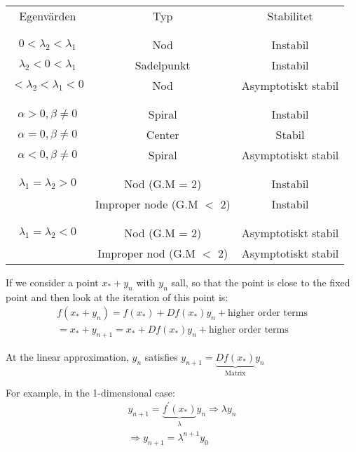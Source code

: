 \begin{center}
  \begin{tabular}{c|c|c}
    Egenvärden&Typ&Stabilitet\\\\
    \hline\\
    $0<\lambda_2<\lambda_1$&Nod&Instabil\\
    $\lambda_2<0<\lambda_1$&Sadelpunkt&Instabil\\
    $<\lambda_2<\lambda_1<0$&Nod&Asymptotiskt stabil\\\\
    \hline\\
    $\alpha>0, \beta\neq0$&Spiral&Instabil\\
    $\alpha=0, \beta\neq0$&Center&Stabil\\
    $\alpha<0, \beta\neq0$&Spiral&Asymptotiskt stabil\\\\
    \hline\\
    $\lambda_1=\lambda_2 > 0$&Nod (G.M = 2)&Instabil\\
    &Improper node (G.M $<$ 2)&Instabil\\\\
    \hline\\
    $\lambda_1=\lambda_2<0$&Nod (G.M = 2)&Asymptotiskt stabil\\
    &Improper nod (G.M $<$ 2)&Asymptotiskt stabil\\
  \end{tabular}
\end{center}
\par\bigskip
\noindent If we consider a point $x_*+y_n$ with $y_n$ sall, so that the point is close to the fixed point and then look at the iteration of this point is:
\begin{equation*}
  \begin{gathered}
    f(x_*+y_n) = f(x_*) + Df(x_*)y_n + \text{higher order terms}\\
    = x_*+y_{n+1} = x_*+Df(x_*)y_n + \text{higher order terms}
  \end{gathered}
\end{equation*}
\par\bigskip
\noindent At the linear approximation, $y_n$ satisfies $y_{n+1} = \underbrace{Df(x_*)}_{\text{Matrix}}y_n$
\par\bigskip
\noindent For example, in the 1-dimensional case:
\begin{equation*}
  \begin{gathered}
    y_{n+1} = \underbrace{f^{\prime}(x_*)}_{\text{$\lambda$}}y_n \Rightarrow \lambda y_n\\
    \Rightarrow y_{n+1} = \lambda^{n+1}y_0
  \end{gathered}
\end{equation*}
